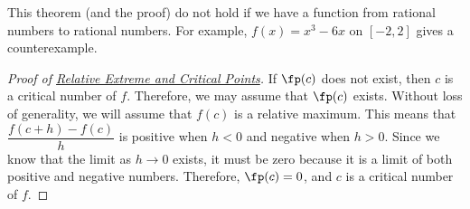 This theorem (and the proof) do not hold if we have a function from rational numbers to rational numbers.  For example, $f(x)=x^3-6x$ on $[-2,2]$ gives a counterexample.

\begin{proof}[Proof of {\hyperref[thm:criticalpts]{Relative Extreme and Critical Points}}]\label{pf:criticalpts}
If $\fp(c)$ does not exist, then $c$ is a critical number of $f$.  Therefore, we may assume that $\fp(c)$ exists.  Without loss of generality, we will assume that $f(c)$ is a relative maximum.  This means that $\dfrac{f(c+h)-f(c)}h$ is positive when $h<0$ and negative when $h>0$.  Since we know that the limit as $h\to0$ exists, it must be zero because it is a limit of both positive and negative numbers.  Therefore, $\fp(c)=0$, and $c$ is a critical number of $f$.
\end{proof}



